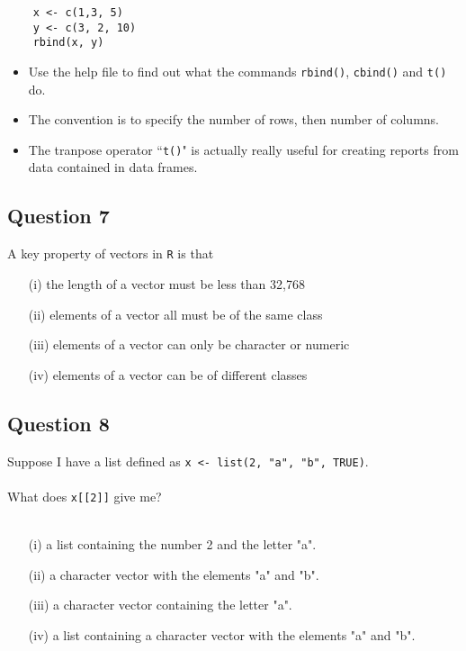\documentclass[12pt]{article}
\begin{document}
\begin{framed}
	\begin{verbatim}
	x <- c(1,3, 5)
	y <- c(3, 2, 10)
	rbind(x, y)
	\end{verbatim}	
\end{framed}
\begin{itemize}
\item Use the help file to find out what the commands \texttt{rbind()}, \texttt{cbind()} and \texttt{t()} do.
\item The convention is to specify the number of rows, then number of columns.
\item The tranpose operator ``\texttt{t()}" is actually really useful for creating reports from data contained in data frames.
\end{itemize}




\newpage
\subsection*{Question 7}
\Large
A key property of vectors in \texttt{R} is that
\begin{itemize}
	\item[(i)] the length of a vector must be less than 32,768
	\item[(ii)] elements of a vector all must be of the same class
	\item[(iii)] elements of a vector can only be character or numeric
	\item[(iv)] elements of a vector can be of different classes
\end{itemize}




\newpage
\subsection*{Question 8}
\Large
Suppose I have a list defined as \texttt{x <- list(2, "a", "b", TRUE)}. \\ \\ What does \texttt{x[[2]]} give me?\\ \\
\begin{itemize}
\item[(i)] a list containing the number 2 and the letter "a".
\item[(ii)] a character vector with the elements "a" and "b".
\item[(iii)] a character vector containing the letter "a".
\item[(iv)] a list containing a character vector with the elements "a" and "b".
\end{itemize}
\end{document}
